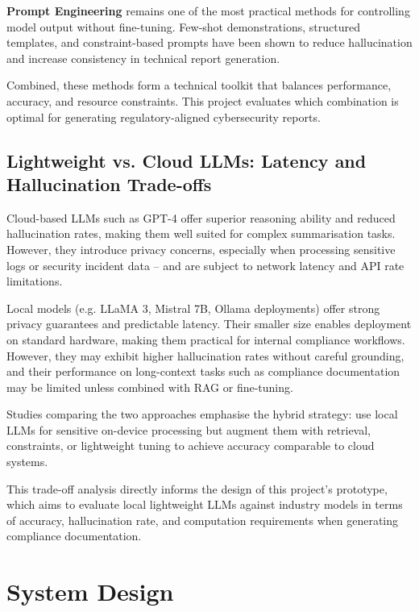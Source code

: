 \documentclass[]{UCD_CS_FYP_Report}
\begin{document}
        \textbf{Prompt Engineering} remains one of the most practical methods for controlling model output without fine-tuning. Few-shot demonstrations, structured templates, and constraint-based prompts have been shown to reduce hallucination and increase consistency in technical report generation.

        Combined, these methods form a technical toolkit that balances performance, accuracy, and resource constraints. This project evaluates which combination is optimal for generating regulatory-aligned cybersecurity reports.

\section{Lightweight vs. Cloud LLMs: Latency and Hallucination Trade-offs}
\label{sec:lightweight_vs_cloud}
        Cloud-based LLMs such as GPT-4 offer superior reasoning ability and reduced hallucination rates, making them well suited for complex summarisation tasks. However, they introduce privacy concerns, especially when processing sensitive logs or security incident data -- and are subject to network latency and API rate limitations.

        Local models (e.g. LLaMA 3, Mistral 7B, Ollama deployments) offer strong privacy guarantees and predictable latency. Their smaller size enables deployment on standard hardware, making them practical for internal compliance workflows. However, they may exhibit higher hallucination rates without careful grounding, and their performance on long-context tasks such as compliance documentation may be limited unless combined with RAG or fine-tuning.

        Studies comparing the two approaches emphasise the hybrid strategy: use local LLMs for sensitive on-device processing but augment them with retrieval, constraints, or lightweight tuning to achieve accuracy comparable to cloud systems.

        This trade-off analysis directly informs the design of this project's prototype, which aims to evaluate local lightweight LLMs against industry models in terms of accuracy, hallucination rate, and computation requirements when generating compliance documentation.


\chapter{System Design}
\label{chp:system_design}
\end{document}
